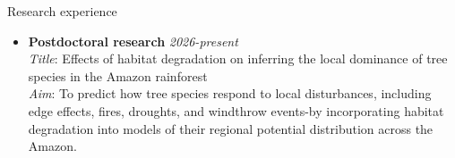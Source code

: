 \documentclass{resume}
\begin{document}
\begin{rSection}{Research experience}
\begin{itemize}
\item \textbf{Postdoctoral research} \hfill{\em 2026-present}\\
\textit{Title}: Effects of habitat degradation on inferring the local dominance of tree species in the Amazon rainforest\\
\textit{Aim}: To  predict how tree species respond to local disturbances, including edge effects, fires, droughts, and windthrow events-by incorporating habitat degradation into models of their regional potential distribution across the Amazon.
\end{itemize}
\end{rSection}

\end{document}
